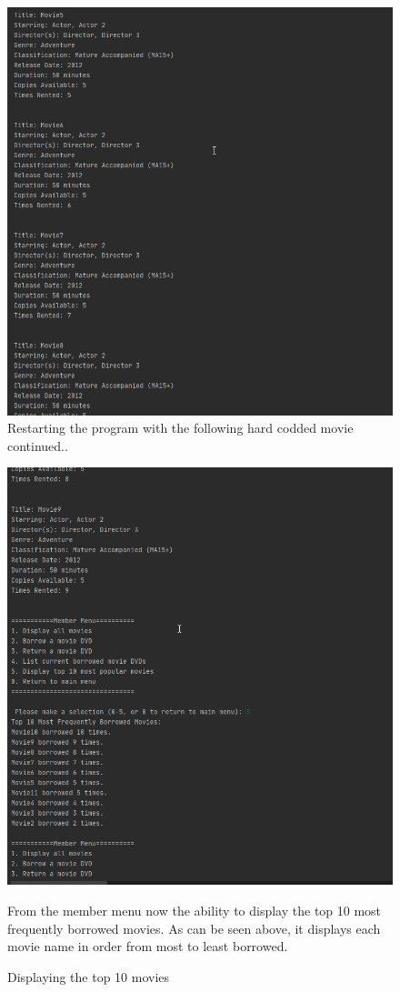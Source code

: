 \documentclass[a4paper,12pt]{article}
\begin{document}
\begin{figure}[!htb]
\centering
\includegraphics[width=1\textwidth]{17}
\caption{Restarting the program with the following hard codded movie continued..}
\medskip
\small

\end{figure}

\begin{figure}[!htb]
\centering
\includegraphics[width=1\textwidth]{18}
\caption{Displaying the top 10 movies}
\medskip
\small
From the member menu now the ability to display the top 10 most frequently borrowed movies. As can be seen above, it displays each movie name in order from most to least borrowed.
\end{figure}
\end{document}
